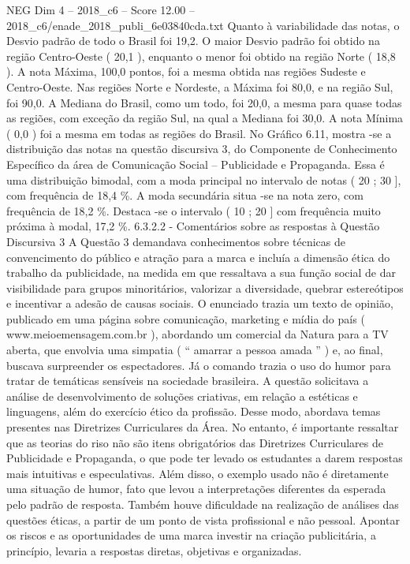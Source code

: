 \begin{textsample}{NEG Dim 4 – 2018\_c6 – Score 12.00 – 2018\_c6/enade\_2018\_publi\_6e03840cda.txt}
Quanto à variabilidade das notas, o Desvio padrão de todo o Brasil foi 19,2.
O maior Desvio padrão foi obtido na região Centro-Oeste ( 20,1 ), enquanto o menor foi obtido na região Norte ( 18,8 ).
A nota Máxima, 100,0 pontos, foi a mesma obtida nas regiões Sudeste e Centro-Oeste.
Nas regiões Norte e Nordeste, a Máxima foi 80,0, e na região Sul, foi 90,0.
A Mediana do Brasil, como um todo, foi 20,0, a mesma para quase todas as regiões, com exceção da região Sul, na qual a Mediana foi 30,0.
A nota Mínima ( 0,0 ) foi a mesma em todas as regiões do Brasil.
No Gráfico 6.11, mostra -se a distribuição das notas na questão discursiva 3, do Componente de Conhecimento Específico da área de Comunicação Social – Publicidade e Propaganda.
Essa é uma distribuição bimodal, com a moda principal no intervalo de notas ( 20 ; 30 ], com frequência de 18,4 \%.
A moda secundária situa -se na nota zero, com frequência de 18,2 \%.
Destaca -se o intervalo ( 10 ; 20 ] com frequência muito próxima à modal, 17,2 \%. 6.3.2.2 - Comentários sobre as respostas à Questão Discursiva 3 A Questão 3 demandava conhecimentos sobre técnicas de convencimento do público e atração para a marca e incluía a dimensão ética do trabalho da publicidade, na medida em que ressaltava a sua função social de dar visibilidade para grupos minoritários, valorizar a diversidade, quebrar estereótipos e incentivar a adesão de causas sociais.
O enunciado trazia um texto de opinião, publicado em uma página sobre comunicação, marketing e mídia do país ( www.meioemensagem.com.br ), abordando um comercial da Natura para a TV aberta, que envolvia uma simpatia ( “ amarrar a pessoa amada ” ) e, ao final, buscava surpreender os espectadores.
Já o comando trazia o uso do humor para tratar de temáticas sensíveis na sociedade brasileira.
A questão solicitava a análise de desenvolvimento de soluções criativas, em relação a estéticas e linguagens, além do exercício ético da profissão.
Desse modo, abordava temas presentes nas Diretrizes Curriculares da Área.
No entanto, é importante ressaltar que as teorias do riso não são itens obrigatórios das Diretrizes Curriculares de Publicidade e Propaganda, o que pode ter levado os estudantes a darem respostas mais intuitivas e especulativas.
Além disso, o exemplo usado não é diretamente uma situação de humor, fato que levou a interpretações diferentes da esperada pelo padrão de resposta.
Também houve dificuldade na realização de análises das questões éticas, a partir de um ponto de vista profissional e não pessoal.
Apontar os riscos e as oportunidades de uma marca investir na criação publicitária, a princípio, levaria a respostas diretas, objetivas e organizadas.

\end{textsample}
